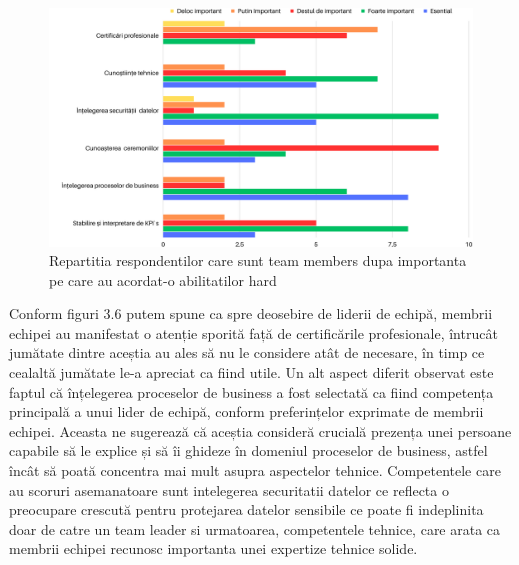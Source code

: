 \documentclass[a4paper, 12pt]{article}
\begin{document}
		\begin{figure}[!htb]
			\centering
			\includegraphics[width=17cm, height=12 cm]{"figures/team members (1).png"}
			\caption {Repartitia respondentilor care sunt team members dupa importanta pe care au acordat-o abilitatilor hard}\label{fig:four}
			
		\end{figure}

		\quad Conform figuri 3.6 putem spune ca spre deosebire de liderii de echipă, membrii echipei au manifestat o atenție sporită față de certificările profesionale, întrucât jumătate dintre aceștia au ales să nu le considere atât de necesare, în timp ce cealaltă jumătate le-a apreciat ca fiind utile. Un alt aspect diferit observat este faptul că înțelegerea proceselor de business a fost selectată ca fiind competența principală a unui lider de echipă, conform preferințelor exprimate de membrii echipei. Aceasta ne sugerează că aceștia consideră crucială prezența unei persoane capabile să le explice și să îi ghideze în domeniul proceselor de business, astfel încât să poată concentra mai mult asupra aspectelor tehnice. Competentele  care au scoruri asemanatoare sunt intelegerea securitatii datelor ce reflecta o preocupare crescută pentru protejarea datelor sensibile ce poate fi indeplinita doar de catre un team leader si urmatoarea, competentele tehnice, care arata ca membrii echipei recunosc importanta unei expertize tehnice solide.
\end{document}
